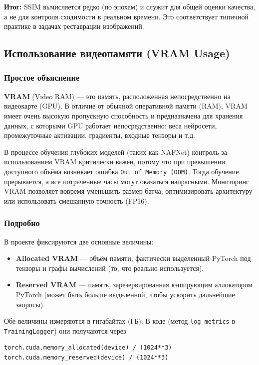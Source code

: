 \documentclass[12pt,a4paper]{article}
\begin{document}
\textbf{Итог:} SSIM вычисляется редко (по эпохам) и служит для общей оценки качества, а не для контроля сходимости в реальном времени. Это соответствует типичной практике в задачах реставрации изображений.

\subsection{Использование видеопамяти (VRAM Usage)}

\subsubsection{Простое объяснение}

\textbf{VRAM} (Video RAM) — это память, расположенная непосредственно на видеокарте (GPU). В отличие от обычной оперативной памяти (RAM), VRAM имеет очень высокую пропускную способность и предназначена для хранения данных, с которыми GPU работает непосредственно: веса нейросети, промежуточные активации, градиенты, входные тензоры и т.д.

В процессе обучения глубоких моделей (таких как NAFNet) контроль за использованием VRAM критически важен, потому что при превышении доступного объёма возникает ошибка \texttt{Out of Memory (OOM)}. Тогда обучение прерывается, а все потраченные часы могут оказаться напрасными. Мониторинг VRAM позволяет вовремя уменьшить размер батча, оптимизировать архитектуру или использовать смешанную точность (FP16).

\subsubsection{Подробно}

В проекте фиксируются две основные величины:

\begin{itemize}
    \item \textbf{Allocated VRAM} — объём памяти, фактически выделенный PyTorch под тензоры и графы вычислений (то, что реально используется).
    \item \textbf{Reserved VRAM} — память, зарезервированная кэширующим аллокатором PyTorch (может быть больше выделенной, чтобы ускорить дальнейшие запросы).
\end{itemize}

Обе величины измеряются в гигабайтах (ГБ). В коде (метод \texttt{log\_metrics} в \texttt{TrainingLogger}) они получаются через
\begin{verbatim}
torch.cuda.memory_allocated(device) / (1024**3)
torch.cuda.memory_reserved(device) / (1024**3)
\end{verbatim}
\end{document}
